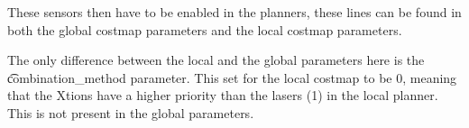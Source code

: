 

These sensors then have to be enabled in the planners, these lines can be found in both the global costmap parameters and the local costmap parameters.



The only difference between the local and the global parameters here is the \t{combination_method} parameter. This set for the local costmap to be 0, meaning that the Xtions have a higher priority than the lasers (1) in the local planner. This is not present in the global parameters.

